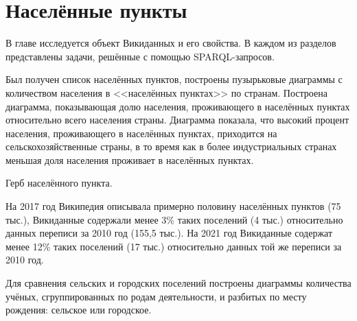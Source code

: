 \chapter{Населённые пункты}
\label{ch:human-settlement}

В главе исследуется объект Викиданных  и его свойства. 
В каждом из разделов представлены задачи, решённые с помощью SPARQL-запросов. 
%

Был получен список населённых пунктов, 
построены пузырьковые диаграммы с количеством населения в <<населённых пунктах>> по странам. 
Построена диаграмма, показывающая долю населения, 
проживающего в населённых пунктах относительно всего населения страны. 
Диаграмма показала, что высокий процент населения, проживающего в населённых пунктах, 
приходится на сельскохозяйственные страны, в то время как в более индустриальных странах 
меньшая доля населения проживает в населённых пунктах. 

\begin{marginfigure}[0.0cm] {
\setlength{\fboxsep}{0pt}%
\setlength{\fboxrule}{1pt}%
%
}
  \caption{Герб населённого пункта.}%
  \label{fig:flag_question_human_settlements1}%
\end{marginfigure}

На 2017 год Википедия описывала примерно половину населённых пунктов (75 тыс.), 
Викиданные содержали менее 3\% таких поселений (4 тыс.) относительно данных переписи за 2010 год (155,5 тыс.). 
На 2021 год Викиданные содержат менее 12\% таких поселений (17 тыс.) 
относительно данных той же переписи за 2010 год. 

Для сравнения сельских и городских поселений 
построены диаграммы количества учёных, сгруппированных по родам деятельности, 
и разбитых по месту рождения: сельское или городское.

